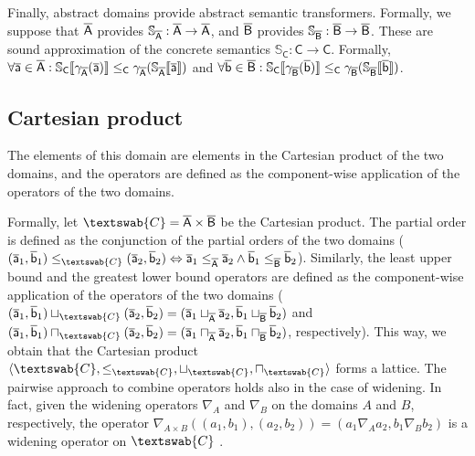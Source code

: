 \documentclass[submission,copyright,creativecommons]{eptcs}
\newcommand{\funzione}[2]{\ensuremath{#1 \rightarrow#2}}
\newcommand{\pair}[2]{\ensuremath{#1 \times #2}}
\newcommand{\sem}[1]{\ensuremath{\llbracket \mathtt{#1} \rrbracket}}
\newcommand{\semanticanome}[1]{\ensuremath{\mathbb{#1}}}
\newcommand{\cset}[1]{\ensuremath{\mathsf{#1}}}
\newcommand{\cel}[1]{\ensuremath{\mathsf{#1}}}
\newcommand{\ael}[1]{\cel{\overline{#1}}}
\newcommand{\firstdomain}{\aset{A}}
\newcommand{\seconddomain}{\aset{B}}
\newcommand{\concretedomain}{\cset{C}}
\newcommand{\cartesiandomain}{\textswab{C}}
\newcommand{\firstsemantics}{\semanticanome{S}_\firstdomain}
\newcommand{\secondsemantics}{\semanticanome{S}_\seconddomain}
\newcommand{\concretesemantics}{\semanticanome{S}_\concretedomain}
\newcommand{\firstsemanticsapplication}[1]{\firstsemantics\sem{#1}}
\newcommand{\secondsemanticsapplication}[1]{\secondsemantics\sem{#1}}
\newcommand{\concretesemanticsapplication}[1]{\concretesemantics\sem{#1}}
\begin{document}
Finally, abstract domains provide abstract semantic transformers. Formally, we suppose that $\firstdomain$ provides $\firstsemantics : \funzione{\firstdomain}{\firstdomain}$, and $\seconddomain$ provides $\secondsemantics : \funzione{\seconddomain}{\seconddomain}$. These are sound approximation of the concrete semantics $\concretesemantics : \funzione{\concretedomain}{\concretedomain}$. Formally, $\forall \ael{a} \in \firstdomain : \concretesemanticsapplication{\gamma_\firstdomain(\ael{a})} \leq_\concretedomain \gamma_\firstdomain(\firstsemanticsapplication{\ael{a}})$ and $\forall \ael{b} \in \seconddomain : \concretesemanticsapplication{\gamma_\seconddomain(\ael{b})} \leq_\concretedomain \gamma_\seconddomain(\secondsemanticsapplication{\ael{b}})$.



\subsection{Cartesian product}
The elements of this domain are elements in the Cartesian product of the two domains, and the operators are defined as the component-wise application of the operators of the two domains. 

Formally, let $\cartesiandomain=\pair{\firstdomain}{\seconddomain}$ be the Cartesian product. The partial order is defined as the conjunction of the partial orders of the two domains ($(\ael{a}_1, \ael{b}_1) \leq_\cartesiandomain (\ael{a}_2, \ael{b}_2) \Leftrightarrow \ael{a}_1 \leq_\firstdomain \ael{a}_2 \wedge \ael{b}_1 \leq_\seconddomain \ael{b}_2$). Similarly, the least upper bound and the greatest lower bound operators are defined as the component-wise application of the operators of the two domains ($(\ael{a}_1, \ael{b}_1) \sqcup_\cartesiandomain (\ael{a}_2, \ael{b}_2) = (\ael{a}_1 \sqcup_\firstdomain \ael{a}_2, \ael{b}_1 \sqcup_\seconddomain \ael{b}_2)$ and $(\ael{a}_1, \ael{b}_1) \sqcap_\cartesiandomain (\ael{a}_2, \ael{b}_2) = (\ael{a}_1 \sqcap_\firstdomain \ael{a}_2, \ael{b}_1 \sqcap_\seconddomain \ael{b}_2)$, respectively). This way, we obtain that the Cartesian product $\langle \cartesiandomain, \leq_\cartesiandomain, \sqcup_\cartesiandomain, \sqcap_\cartesiandomain \rangle$ forms a lattice. The pairwise approach to combine operators holds also in the case of widening. In fact, given  the widening operators $\nabla_A$ and $\nabla_B$ on the domains $A$ and $B$, respectively, the operator $\nabla_{A \times B}((a_1,b_1),(a_2,b_2))=(a_1 \nabla_A a_2, b_1 \nabla_B b_2)$ is a widening operator on $\cartesiandomain$ \cite{ZanioliCortesi}.
\end{document}
